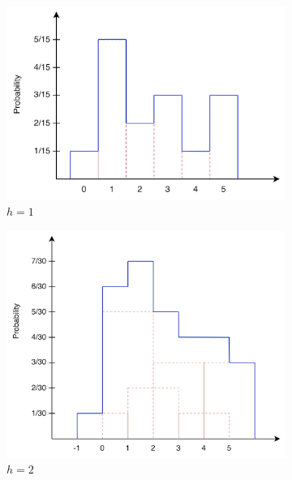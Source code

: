 \documentclass{article}
\begin{document}
\begin{figure}[h]
    \begin{subfigure}{0.3\linewidth}
        \centering
        \includegraphics[width=\linewidth]{images/q1/parzen_h1.png}
        \caption{$h=1$}
    \end{subfigure}
    \hfill
    \begin{subfigure}{0.3\linewidth}
        \centering
        \includegraphics[width=\linewidth]{images/q1/parzen_h2.png}
        \caption{$h=2$}
    \end{subfigure}
    \hfill
    \begin{subfigure}{0.3\linewidth}
        \centering

\end{subfigure}
\end{figure}
\end{document}
